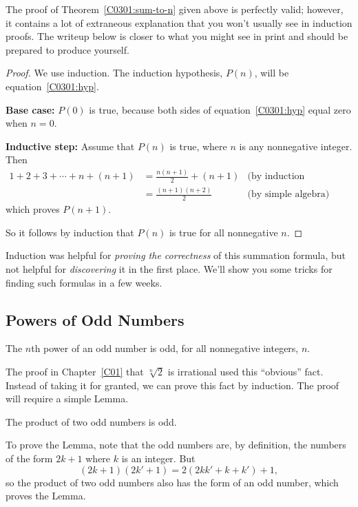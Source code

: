The proof of Theorem~\ref{C0301:sum-to-n} given above is perfectly valid;
however, it contains a lot of extraneous explanation that you won't
usually see in induction proofs.  The writeup below is closer to what
you might see in print and should be prepared to produce yourself.

\begin{proof}
We use induction.  The induction hypothesis, $P(n)$, will be
equation~\eqref{C0301:hyp}.

\textbf{Base case:} $P(0)$ is true, because both sides of
equation~\eqref{C0301:hyp} equal zero when $n=0$.

\textbf{Inductive step:} Assume that $P(n)$ is true, where
$n$ is any nonnegative integer.  Then
\begin{align*}
1 + 2 + 3 + \cdots + n + (n+1)
    & = \frac{n(n+1)}{2} + (n+1) & \text{(by induction hypothesis)}\\
    & = \frac{(n+1)(n+2)}{2}  & \text{(by simple algebra)}
\end{align*}
which proves $P(n+1)$.

So it follows by induction that $P(n)$ is true for all nonnegative $n$.
\end{proof}

Induction was helpful for \textit{proving the correctness} of this
summation formula, but not helpful for \textit{discovering} it in the
first place.  We'll show you some tricks for finding such formulas in a
few weeks.

\subsection{Powers of Odd Numbers}

\begin{fact*}
The $n$th power of an odd number is odd, for all nonnegative integers, $n$.
\end{fact*}
The proof in Chapter~\ref{C01} that $\sqrt[n]{2}$ is irrational used this 
``obvious'' fact.  Instead of taking it for granted, we can prove this fact
by induction.
The proof will require a simple Lemma.
\begin{lemma*}
The product of two odd numbers is odd.
\end{lemma*}
To prove the Lemma, note that the odd numbers are, by definition, the
numbers of the form $2k+1$ where $k$ is an integer.  But
\[
(2k+1)(2k'+1) = 2(2kk' + k + k')+1,
\]
so the product of two odd numbers also has the form of an odd number,
which proves the Lemma.

